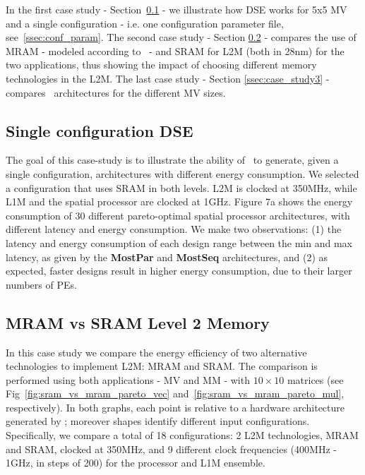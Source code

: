 In the first case study - Section~\ref{ssec:exp_single} - we illustrate how DSE works for 5x5 MV and a single configuration - i.e. one configuration parameter file, see~\ref{ssec:conf_param}. The second case study - Section \ref{ssec:case_study2} - compares the use of MRAM - modeled according to~\cite{8310393} - and SRAM for L2M (both in 28nm) for the two applications, thus showing the impact of choosing different memory technologies in the L2M. The last case study - Section \ref{ssec:case_study3} - compares \frameworkname~architectures for the different MV sizes.

\vspace{-1mm}
\subsection{Single configuration DSE}
\label{ssec:exp_single}
\vspace{-1mm}
The goal of this case-study is to illustrate the ability of \frameworkname~to generate, given a single configuration, architectures with different energy consumption. We selected a configuration that uses SRAM in both levels. L2M is clocked at 350MHz, while L1M and the spatial processor are clocked at 1GHz. Figure 7a shows the energy consumption of 30 different pareto-optimal spatial processor architectures, with different latency and energy consumption. We make two observations: (1) the latency and energy consumption of each design range between the min and max latency, as given by the \textbf{MostPar} and \textbf{MostSeq} architectures, and (2) as expected, faster designs result in higher energy consumption, due to their larger numbers of PEs.


\vspace{-1mm}
\subsection{MRAM vs SRAM Level 2 Memory}
\label{ssec:case_study2}
\vspace{-1mm}

In this case study we compare the energy efficiency of two alternative technologies to implement L2M: MRAM and SRAM.
The comparison is performed using both applications - MV and MM - with $10\times10$ matrices (see Fig~\ref{fig:sram_vs_mram_pareto_vec} and~\ref{fig:sram_vs_mram_pareto_mul}, respectively). In both graphs, each point is relative to a hardware architecture generated by \frameworkname; moreover shapes identify different input configurations. Specifically, we compare a total of 18 configurations: 2 L2M technologies, MRAM and SRAM, clocked at 350MHz, and 9 different clock frequencies (400MHz - 1GHz, in steps of 200) for the processor and L1M ensemble.

